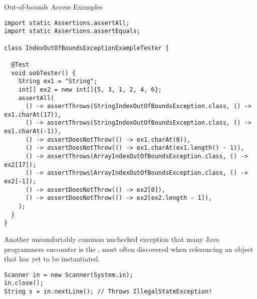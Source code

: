 \begin{cl}{Out-of-bounds Access Examples}
\begin{lstlisting}[language=MyJava]
import static Assertions.assertAll;
import static Assertions.assertEquals;

class IndexOutOfBoundsExceptionExampleTester {

  @Test
  void oobTester() {
    String ex1 = "String";
    int[] ex2 = new int[]{5, 3, 1, 2, 4, 6}; 
    assertAll(
      () -> assertThrows(StringIndexOutOfBoundsException.class, () -> ex1.charAt(17)),
      () -> assertThrows(StringIndexOutOfBoundsException.class, () -> ex1.charAt(-1)),
      () -> assertDoesNotThrow(() -> ex1.charAt(0)),
      () -> assertDoesNotThrow(() -> ex1.charAt(ex1.length() - 1)),
      () -> assertThrows(ArrayIndexOutOfBoundsException.class, () -> ex2[17]);
      () -> assertThrows(ArrayIndexOutOfBoundsException.class, () -> ex2[-1]);
      () -> assertDoesNotThrow(() -> ex2[0]),
      () -> assertDoesNotThrow(() -> ex2[ex2.length - 1]),
    );
  } 
}
\end{lstlisting}
\end{cl} 

Another uncomfortably common unchecked exception that many Java programmers encounter is the , most often discovered when referencing an object that has yet to be instantiated. 


{\footnotesize
\begin{verbatim}
Scanner in = new Scanner(System.in);
in.close();
String s = in.nextLine(); // Throws IllegalStateException!
\end{verbatim}
\par}
